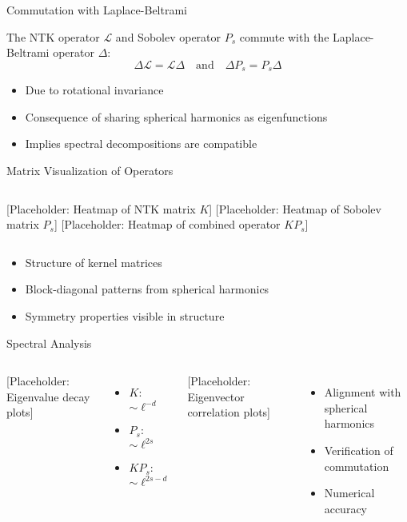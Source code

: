 \documentclass{beamer}
\newcommand{\Lap}{\Delta}
\begin{document}
\begin{frame}{Commutation with Laplace-Beltrami}
\begin{theorem}
The NTK operator $\mathcal{L}$ and Sobolev operator $P_s$ commute with the Laplace-Beltrami operator $\Lap$:
\[ \Lap \mathcal{L} = \mathcal{L} \Lap \quad \text{and} \quad \Lap P_s = P_s \Lap \]
\begin{itemize}
\item Due to rotational invariance
\item Consequence of sharing spherical harmonics as eigenfunctions
\item Implies spectral decompositions are compatible
\end{itemize}
\end{theorem}
\end{frame}

\begin{frame}{Matrix Visualization of Operators}
\begin{columns}
[Placeholder: Heatmap of NTK matrix $K$]
[Placeholder: Heatmap of Sobolev matrix $P_s$]
[Placeholder: Heatmap of combined operator $KP_s$]
\end{columns}
\begin{itemize}
\item Structure of kernel matrices
\item Block-diagonal patterns from spherical harmonics
\item Symmetry properties visible in structure
\end{itemize}
\end{frame}

\begin{frame}{Spectral Analysis}
\begin{columns}
[Placeholder: Eigenvalue decay plots]
\begin{itemize}
\item $K$: $\sim \ell^{-d}$
\item $P_s$: $\sim \ell^{2s}$
\item $KP_s$: $\sim \ell^{2s-d}$
\end{itemize}
[Placeholder: Eigenvector correlation plots]
\begin{itemize}
\item Alignment with spherical harmonics
\item Verification of commutation
\item Numerical accuracy
\end{itemize}
\end{columns}
\end{frame}
\end{document}
